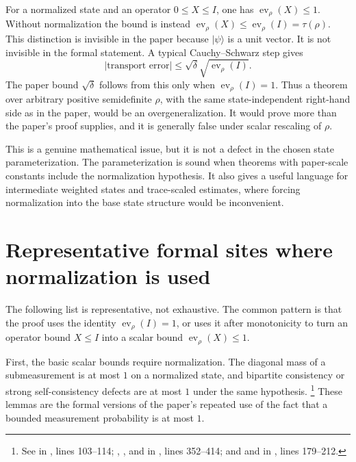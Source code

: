 \documentclass[11pt]{article}
\newcommand{\ev}{\operatorname{ev}}
\begin{document}
For a normalized state and an operator $0\le X\le I$, one has
$\ev_\rho(X)\le 1$. Without normalization the bound is instead
$\ev_\rho(X)\le\ev_\rho(I)=\tau(\rho)$. This distinction is invisible in the
paper because $|\psi\rangle$ is a unit vector. It is not invisible in the
formal statement. A typical Cauchy--Schwarz step gives
\[
  |\text{transport error}|
    \le \sqrt{\delta} \sqrt{\ev_\rho(I)}.
\]
The paper bound $\sqrt\delta$ follows from this only when
$\ev_\rho(I)=1$. Thus a theorem over arbitrary positive semidefinite
$\rho$, with the same state-independent right-hand side as in the paper, would
be an overgeneralization. It would prove more than the paper's proof supplies,
and it is generally false under scalar rescaling of $\rho$.

This is a genuine mathematical issue, but it is not a defect in the chosen
state parameterization. The parameterization is sound when theorems with
paper-scale constants include the normalization hypothesis. It also gives a
useful language for intermediate weighted states and trace-scaled estimates,
where forcing normalization into the base state structure would be inconvenient.

\section{Representative formal sites where normalization is used}

The following list is representative, not exhaustive. The common pattern is
that the proof uses the identity $\ev_\rho(I)=1$, or uses it after monotonicity
to turn an operator bound $X\le I$ into a scalar bound $\ev_\rho(X)\le 1$.

First, the basic scalar bounds require normalization. The diagonal mass of a
submeasurement is at most $1$ on a normalized state, and bipartite consistency
or strong self-consistency defects are at most $1$ under the same hypothesis.
\footnote{See  in
, lines
103--114; ,
, and
 in ,
lines 352--414; and  and
 in
, lines 179--212.}
These lemmas are the formal versions of the paper's repeated use of the fact
that a bounded measurement probability is at most $1$.
\end{document}
